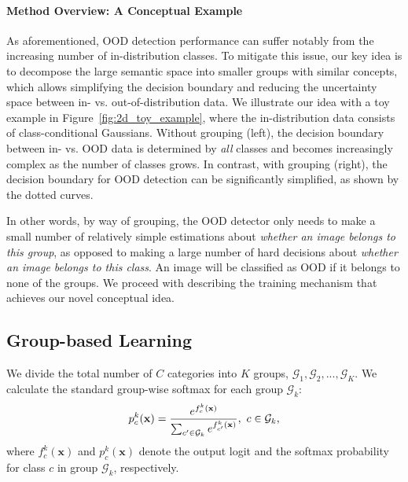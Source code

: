 \documentclass[final]{cvpr}
\begin{document}
\paragraph{Method Overview: A Conceptual Example} As aforementioned, OOD detection performance can suffer notably from the increasing number of in-distribution classes. To mitigate this issue, our key idea is to decompose the large semantic space into smaller groups with similar concepts, which allows simplifying the decision boundary and reducing the uncertainty space between in- vs. out-of-distribution data. We illustrate our idea with a toy example in Figure~\ref{fig:2d_toy_example}, where the in-distribution data consists of  class-conditional Gaussians. Without grouping (left), the decision boundary between in- vs. OOD data is determined by \emph{all} classes and becomes increasingly complex as the number of classes grows. In contrast, with grouping (right), the decision boundary for OOD detection can be significantly simplified, as shown by the dotted curves. 

In other words, by way of grouping, the OOD detector only needs to make a small number of relatively simple estimations about \textit{whether an image belongs to this group}, as opposed to making a large number of hard decisions about \textit{whether an image belongs to this class}.  An image will be classified as OOD if it belongs to none of the groups. We proceed with describing the training mechanism that achieves our novel conceptual idea.  

\subsection{Group-based Learning}
\label{sec:group-softmax}
We divide the total number of $C$ categories into $K$ groups, $\mathcal{G}_1, \mathcal{G}_2, ..., \mathcal{G}_K$. We calculate the standard group-wise softmax for each group $\mathcal{G}_k$:
\vspace{-0.2cm}
\begin{equation}
    p_c^k (\mathbf{x}) = \frac{e^{f_c^k (\mathbf{x})}}{\sum_{c' \in \mathcal{G}_k} e^{f_{c'}^k (\mathbf{x})}}, \ c \in \mathcal{G}_k,
\vspace{-0.1cm}
\end{equation}
where $f_c^k (\mathbf{x})$ and $p_c^k (\mathbf{x})$ denote the output logit and the softmax probability for class $c$ in group $\mathcal{G}_k$, respectively.

\vspace{-0.2cm}
\end{document}
